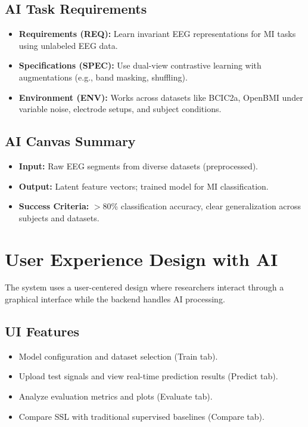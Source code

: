 \begin{itemize}
    \subsection{AI Task Requirements}
    \begin{itemize}
        \item \textbf{Requirements (REQ):} Learn invariant EEG representations for MI tasks using unlabeled EEG data.
        \item \textbf{Specifications (SPEC):} Use dual-view contrastive learning with augmentations (e.g., band masking, shuffling).
        \item \textbf{Environment (ENV):} Works across datasets like BCIC2a, OpenBMI under variable noise, electrode setups, and subject conditions.
    \end{itemize}

    \subsection{AI Canvas Summary}
    \begin{itemize}
        \item \textbf{Input:} Raw EEG segments from diverse datasets (preprocessed).
        \item \textbf{Output:} Latent feature vectors; trained model for MI classification.
        \item \textbf{Success Criteria:} $>$80\% classification accuracy, clear generalization across subjects and datasets.
    \end{itemize}

    \section{User Experience Design with AI}
    \label{sec:ux-ai}

    The system uses a user-centered design where researchers interact through a graphical interface while the backend handles AI processing.

    \subsection*{UI Features}
    \begin{itemize}
        \item Model configuration and dataset selection (Train tab).
        \item Upload test signals and view real-time prediction results (Predict tab).
        \item Analyze evaluation metrics and plots (Evaluate tab).
        \item Compare SSL with traditional supervised baselines (Compare tab).
    \end{itemize}


\end{itemize}
